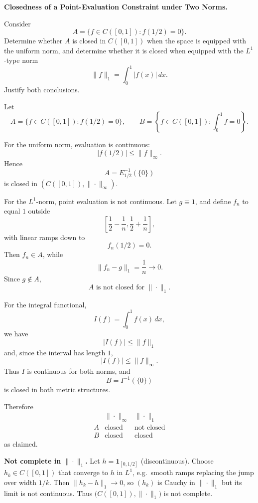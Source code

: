 \begin{problem}[CP-II-0022]
\label{prob:cp-ii-0022}
\textbf{Closedness of a Point-Evaluation Constraint under Two Norms.}

\hspace*{1.5em}Consider
\[
A=\{f\in C([0,1]):f(1/2)=0\}.
\]
Determine whether \(A\) is closed in \(C([0,1])\) when the space is equipped
with the uniform norm, and determine whether it is closed when equipped with
the \(L^1\)-type norm
\[
\|f\|_1=\int_0^1|f(x)|\,dx.
\]
Justify both conclusions.
\end{problem}

\begin{solution}
Let
\[
A=\{f\in C([0,1]):f(1/2)=0\},
\qquad
B=\left\{f\in C([0,1]):\int_0^1f=0\right\}.
\]

For the uniform norm, evaluation is continuous:
\[
|f(1/2)|
\le
\|f\|_\infty.
\]
Hence
\[
A=E_{1/2}^{-1}(\{0\})
\]
is closed in \((C([0,1]),\|\cdot\|_\infty)\).

For the \(L^1\)-norm, point evaluation is not continuous. Let \(g\equiv1\), and define \(f_n\) to equal \(1\) outside
\[
\left[\frac12-\frac1n,\frac12+\frac1n\right],
\]
with linear ramps down to
\[
f_n(1/2)=0.
\]
Then \(f_n\in A\), while
\[
\|f_n-g\|_1
=
\frac1n
\longrightarrow0.
\]
Since \(g\notin A\),
\[
\boxed{A\text{ is not closed for }\|\cdot\|_1.}
\]

For the integral functional,
\[
I(f)=\int_0^1f(x)\,dx,
\]
we have
\[
|I(f)|
\le
\|f\|_1
\]
and, since the interval has length \(1\),
\[
|I(f)|
\le
\|f\|_\infty.
\]
Thus \(I\) is continuous for both norms, and
\[
B=I^{-1}(\{0\})
\]
is closed in both metric structures.

Therefore
\[
\boxed{
\begin{array}{c|cc}
 & \|\cdot\|_\infty & \|\cdot\|_1\\ \hline
A & \text{closed} & \text{not closed}\\
B & \text{closed} & \text{closed}
\end{array}}
\]
as claimed.
\end{solution}


\begin{problem}[CP-II-0028]
\label{prob:cp-ii-0028}
\textbf{Not complete in $\|\cdot\|_{1}$.}
	Let $h=\mathbf{1}_{[0,1/2]}$ (discontinuous). Choose $h_k\in C([0,1])$ that converge to $h$ in $L^{1}$,
	e.g.\ smooth ramps replacing the jump over width $1/k$. Then $\|h_k-h\|_{1}\to 0$, so $(h_k)$ is Cauchy in
	$\|\cdot\|_{1}$ but its limit is not continuous. Thus $\big(C([0,1]),\|\cdot\|_{1}\big)$ is not complete.
\end{problem}

